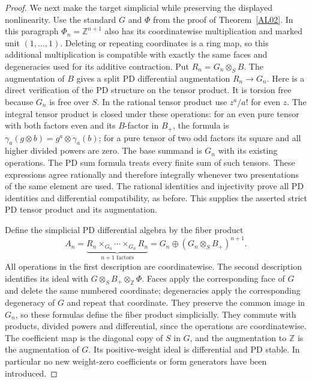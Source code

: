 \begin{proof}
We next make the target simplicial while preserving the
displayed nonlinearity.  Use the standard $G$ and $\Phi$
from the proof of Theorem~\ref{AL02}.  In this paragraph
$\Phi_n=\mathbb Z^{n+1}$ also has its coordinatewise
multiplication and marked unit $(1,\ldots,1)$.
Deleting or repeating coordinates is a ring map, so this
additional multiplication is compatible with exactly the
same faces and degeneracies used for its additive contraction.
Put $R_n=G_n\otimes_S B$.  The augmentation of $B$ gives
a split PD differential augmentation $R_n\to G_n$.
Here is a direct verification of the PD structure on the tensor
product.  It is torsion free because $G_n$ is free over $S$.
In the rational tensor product use $z^a/a!$ for even $z$.
The integral tensor product is closed under these operations:
for an even pure tensor with both factors even and its
$B$-factor in $B_+$, the formula is
$\gamma_a(g\otimes b)=g^a\otimes\gamma_a(b)$;
for a pure tensor of two odd factors its square and all
higher divided powers are zero.  The base summand is $G_n$
with its existing operations.  The PD sum formula treats
every finite sum of such tensors.  These expressions agree
rationally and therefore integrally whenever two presentations
of the same element are used.  The rational identities and
injectivity prove all PD identities and differential
compatibility, as before.  This supplies the asserted
strict PD tensor product and its augmentation.

Define the simplicial PD differential algebra by the fiber
product
\[
 A_n=\underbrace{R_n\times_{G_n}\cdots\times_{G_n}R_n}_{n+1
             \text{ factors}}
     =G_n\oplus (G_n\otimes_S B_+)^{n+1}.
 \tag{AL.18}
\]
All operations in the first description are coordinatewise.
The second description identifies its ideal with
$G\otimes_S B_+\otimes_{\mathbb Z}\Phi$.
Faces apply the corresponding face of $G$ and delete the
same numbered coordinate; degeneracies apply the
corresponding degeneracy of $G$ and repeat that coordinate.
They preserve the common image in $G_n$, so these formulas
define the fiber product simplicially.  They commute with
products, divided powers and differential, since the
operations are coordinatewise.  The coefficient map is
the diagonal copy of $S$ in $G$, and the augmentation to
$\mathbb Z$ is the augmentation of $G$.  Its
positive-weight ideal is differential and PD stable.
In particular no new weight-zero coefficients or form
generators have been introduced.


\end{proof}
